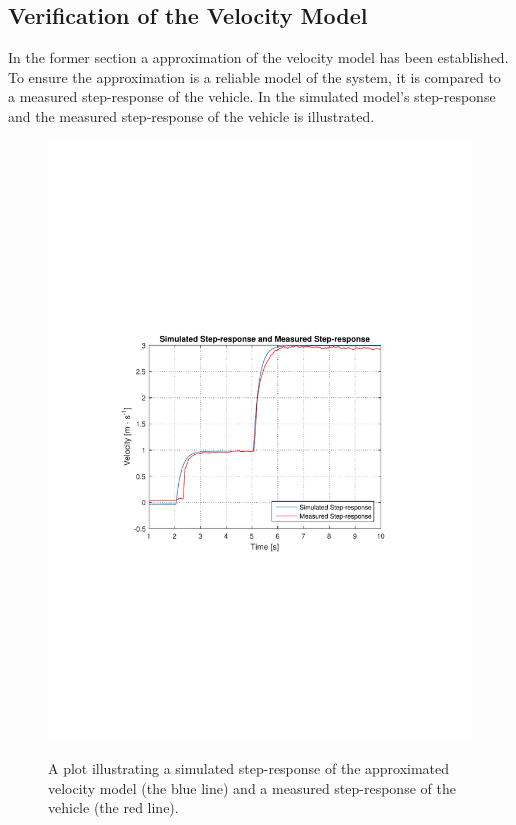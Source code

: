 \subsection{Verification of the Velocity Model}
In the former section a approximation of the velocity model has been established. To ensure the approximation is a reliable model of the system, it is compared to a measured step-response of the vehicle. In  the simulated model's step-response and the measured step-response of the vehicle is illustrated. 

\begin{figure}[H]
  \centering
  {
    \includegraphics[width=1.4\textwidth]{figures/SimulationIRLsteprespons2.pdf}
  }
  \caption{A plot illustrating a simulated step-response of the approximated velocity model (the blue line) and a measured step-response of the vehicle (the red line).}
  \label{SimulationIRLsteprespons2}
\end{figure}

